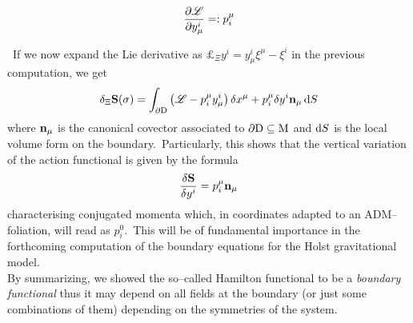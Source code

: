 \begin{defi}\label{momenta}
    $$\frac{\partial\mathscr{L}}{\partial y^i_\mu}=:p^\mu_i$$
\end{defi}
\,\newline
If we now expand the Lie derivative as $\pounds_\Xi y^i=y^i_\mu\xi^\mu-\xi^i$ in the previous computation, we get 
$$\delta_\Xi\mathbf{S}(\sigma)=\int_{\partial\text{\normalfont D}}\left(\mathscr{L}-p^\mu_iy^i_\mu\right)\delta x^\mu+p^\mu_i\delta y^i\mathbf{n}_\mu\,\text{\normalfont d} S$$
where $\mathbf{n}_\mu$ is the canonical covector associated to $\partial\text{\normalfont D}\subseteq\text{\normalfont M}$ and $\text{\normalfont d} S$ is the local volume form on the boundary.\, Particularly, this shows that the vertical variation of the action functional is given by the formula
\begin{equation}\label{boundary_S}
    \frac{\delta\mathbf{S}}{\delta y^i}=p^\mu_i\mathbf{n}_\mu
\end{equation}
characterising conjugated momenta which, in coordinates adapted to an ADM--foliation, will read as $p^0_i$.\, This will be of fundamental importance in the forthcoming computation of the boundary equations for the Holst gravitational model.\\

By summarizing, we showed the so--called Hamilton functional to be a \emph{boundary functional} thus it may depend on all fields at the boundary (or just some combinations of them) depending on the symmetries of the system.

